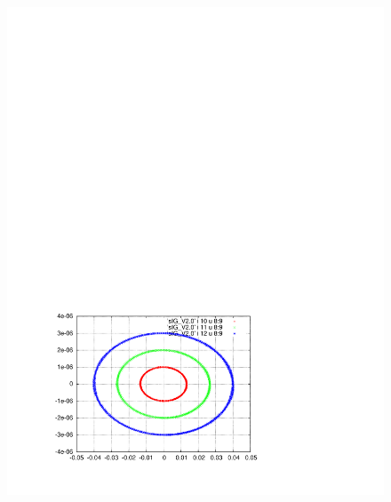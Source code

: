 \documentclass[]{article}
\begin{document}
\begin{figure}[h]
\begin{minipage}[b]{0.45\linewidth}
\includegraphics[scale=0.6]{pdf/delta_vs_ct_V2p0.pdf}
\end{minipage}
%
%
\begin{minipage}[b]{0.45\linewidth}
\centering

\end{minipage}
\end{figure}
\end{document}
